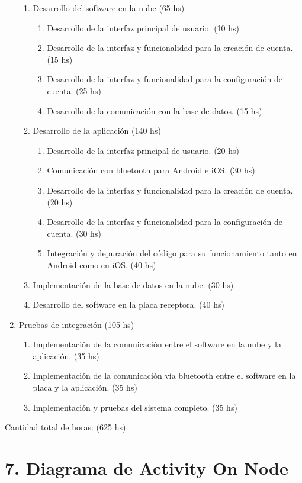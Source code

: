 \documentclass[11pt]{charter}
\begin{document}
\begin{enumerate}
\begin{enumerate}
	\item Desarrollo del software en la nube (65 hs)
		\begin{enumerate}
		\item Desarrollo de la interfaz principal de usuario. (10 hs)
		\item Desarrollo de la interfaz y funcionalidad para la creación de cuenta. (15 hs)
		\item Desarrollo de la interfaz y funcionalidad para la configuración de cuenta. (25 hs)
		\item Desarrollo de la comunicación con la base de datos. (15 hs)
		\end{enumerate}
	\item Desarrollo de la aplicación (140 hs)
		\begin{enumerate}
		\item Desarrollo de la interfaz principal de usuario. (20 hs)
		\item Comunicación con bluetooth para Android e iOS. (30 hs)
		\item Desarrollo de la interfaz y funcionalidad para la creación de cuenta. (20 hs)
		\item Desarrollo de la interfaz y funcionalidad para la configuración de cuenta. (30 hs)
		\item Integración y depuración del código para su funcionamiento tanto en Android como en iOS. (40 hs)
		\end{enumerate}
	\item Implementación de la base de datos en la nube. (30 hs)
	\item Desarrollo del software en la placa receptora. (40 hs)
	\end{enumerate}
\item Pruebas de integración (105 hs)
	\begin{enumerate}
	\item Implementación de la comunicación entre el software en la nube y la aplicación. (35 hs)
	\item Implementación de la comunicación vía bluetooth entre el software en la placa y la aplicación. (35 hs)
	\item Implementación y pruebas del sistema completo. (35 hs)
	\end{enumerate}
	
\end{enumerate}

Cantidad total de horas: (625 hs)


\section{7. Diagrama de Activity On Node}
\label{sec:AoN}
\end{document}

